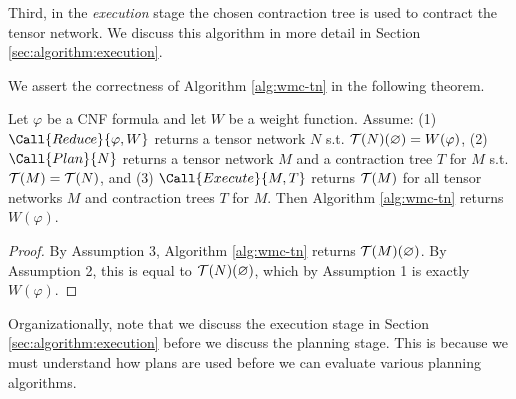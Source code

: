 Third, in the \emph{execution} stage the chosen contraction tree is used to contract the tensor network. We discuss this algorithm in more detail in Section \ref{sec:algorithm:execution}.

We assert the correctness of Algorithm \ref{alg:wmc-tn} in the following theorem.
\begin{theorem}
\label{thm:alg-correctness}
Let $\varphi$ be a CNF formula and let $W$ be a weight function. 
    Assume:
    (1) $\Call{Reduce}{\varphi, W}$ returns a tensor network $N$ s.t. $\mathcal{T}(N)(\varnothing) = W(\varphi)$,
    (2) $\Call{Plan}{N}$ returns a tensor network $M$ and a contraction tree $T$ for $M$ s.t. $\mathcal{T}(M) = \mathcal{T}(N)$, and
    (3) $\Call{Execute}{M, T}$ returns $\mathcal{T}(M)$ for all tensor networks $M$ and contraction trees $T$ for $M$.
Then Algorithm \ref{alg:wmc-tn} returns $W(\varphi)$.
\end{theorem}
\begin{proof}
By Assumption 3, Algorithm \ref{alg:wmc-tn} returns $\mathcal{T}(M)(\varnothing)$. By Assumption 2, this is equal to $\mathcal{T}(N)(\varnothing)$, which by Assumption 1 is exactly $W(\varphi)$.
\end{proof}

Organizationally, note that we discuss the execution stage in Section \ref{sec:algorithm:execution} before we discuss the planning stage. This is because we must understand how plans are used before we can evaluate various planning algorithms.

